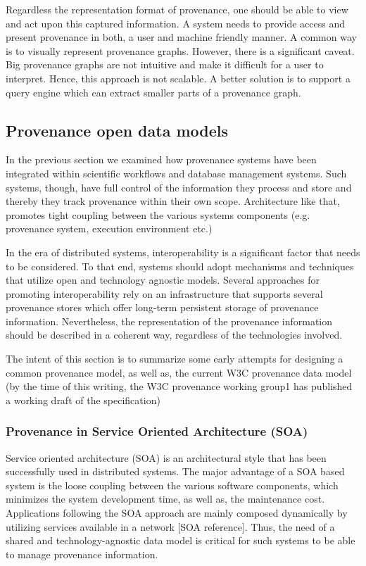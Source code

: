 Regardless the representation format of provenance, one should be able to view and act upon this captured information. A system needs to provide access and present provenance in both, a user and machine friendly manner. A common way is to visually represent provenance graphs. However, there is a significant caveat. Big provenance graphs are not intuitive and make it difficult for a user to interpret. Hence, this approach is not scalable. A better solution is to support a query engine which can extract smaller parts of a provenance graph.

\subsection{Provenance open data models}

In the previous section we examined how provenance systems have been integrated within scientific workflows and database management systems. Such systems, though, have full control of the information they process and store and thereby they track provenance within their own scope. Architecture like that, promotes tight coupling between the various systems components (e.g. provenance system, execution environment etc.)\cite{reference8}

In the era of distributed systems, interoperability is a significant factor that needs to be considered. To that end, systems should adopt mechanisms and techniques that utilize open and technology agnostic models. Several approaches for promoting interoperability rely on an infrastructure that supports several provenance stores\cite{reference8:55}\cite{reference8:56} which offer long-term persistent storage of provenance information. Nevertheless, the representation of the provenance information should be described in a coherent way, regardless of the technologies involved.

The intent of this section is to summarize some early attempts for designing a common provenance model, as well as, the current W3C provenance data model (by the time of this writing, the W3C provenance working group1 has published a working draft of the specification)


\subsubsection{Provenance in Service Oriented Architecture (SOA)}

Service oriented architecture (SOA) is an architectural style that has been successfully used in distributed systems. The major advantage of a SOA based system is the loose coupling between the various software components, which minimizes the system development time, as well as, the maintenance cost. Applications following the SOA approach are mainly composed dynamically by utilizing services available in a network [SOA reference]. Thus, the need of a shared and technology-agnostic data model is critical for such systems to be able to manage provenance information.

